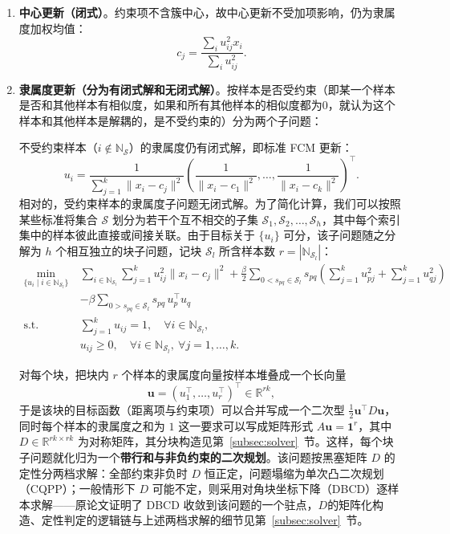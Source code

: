 \documentclass[11pt,a4paper]{ctexart}
\begin{document}
	\begin{enumerate}[label=(\arabic*)]
		\item \textbf{中心更新（闭式）}。约束项不含簇中心，故中心更新不受加项影响，仍为隶属度加权均值：
		\begin{equation}\label{eq:c-update}
			c_j = \frac{\sum_i u_{ij}^{2} x_i}{\sum_i u_{ij}^{2}}.
		\end{equation}
		
		\item \textbf{隶属度更新（分为有闭式解和无闭式解）}。按样本是否受约束（即某一个样本是否和其他样本有相似度，如果和所有其他样本的相似度都为0，就认为这个样本和其他样本是解耦的，是不受约束的）分为两个子问题：
		
		不受约束样本（$i \notin \mathbb{N}_{\mathcal{S}}$）的隶属度仍有闭式解，即标准 FCM 更新：
		\begin{equation}\label{eq:u-closed}
			u_i = \frac{1}{\sum_{j=1}^{k} \|x_i - c_j\|^{2}}
			\left( \frac{1}{\|x_i - c_1\|^{2}}, \ldots, \frac{1}{\|x_i - c_k\|^{2}} \right)^{\!\top}.
		\end{equation}
		相对的，受约束样本的隶属度子问题无闭式解。为了简化计算，我们可以按照某些标准将集合 $\mathcal{S}$ 划分为若干个互不相交的子集 $\mathcal{S}_1, \mathcal{S}_2, \ldots, \mathcal{S}_h$，其中每个索引集中的样本彼此直接或间接关联。由于目标关于 $\{u_i\}$ 可分，该子问题随之分解为 $h$ 个相互独立的块子问题，记块 $\mathcal{S}_l$ 所含样本数 $r = |\mathbb{N}_{\mathcal{S}_l}|$：
		\begin{equation}\label{eq:block-qp}
			\begin{aligned}
				\min_{\{u_i \mid i \in \mathbb{N}_{\mathcal{S}_l}\}}\ &
				\sum_{i \in \mathbb{N}_{\mathcal{S}_l}} \sum_{j=1}^{k} u_{ij}^{2} \|x_i - c_j\|^{2}
				+ \frac{\beta}{2} \sum_{0 < s_{pq} \in \mathcal{S}_l} s_{pq} \left( \sum_{j=1}^{k} u_{pj}^{2} + \sum_{j=1}^{k} u_{qj}^{2} \right) \\
				& - \beta \sum_{0 > s_{pq} \in \mathcal{S}_l} s_{pq}\, u_p^{\top} u_q \\
				\text{s.t.}\ & \sum_{j=1}^{k} u_{ij} = 1,\quad \forall i \in \mathbb{N}_{\mathcal{S}_l}, \\
				& u_{ij} \ge 0,\quad \forall i \in \mathbb{N}_{\mathcal{S}_l},\ \forall j = 1, \ldots, k.
			\end{aligned}
		\end{equation}
		
	对每个块，把块内 \(r\) 个样本的隶属度向量按样本堆叠成一个长向量
	\[
	\mathbf{u}=(u_1^{\top},\ldots,u_r^{\top})^{\top}\in\mathbb{R}^{rk},
	\]
	于是该块的目标函数（距离项与约束项）可以合并写成一个二次型 $\frac{1}{2}\mathbf{u}^{\top}D\mathbf{u}$，同时每个样本的隶属度之和为 $1$ 这一要求可以写成矩阵形式 $A\mathbf{u}=\mathbf{1}^r$，其中 $D\in\mathbb{R}^{rk\times rk}$ 为对称矩阵，其分块构造见第~\ref{subsec:solver}~节。这样，每个块子问题就化归为一个\textbf{带行和与非负约束的二次规划}。该问题按黑塞矩阵 $D$ 的定性分两档求解：全部约束非负时 $D$ 恒正定，问题塌缩为单次凸二次规划（CQPP）；一般情形下 $D$ 可能不定，则采用对角块坐标下降（DBCD）逐样本求解——原论文证明了 DBCD 收敛到该问题的一个驻点，$D$的矩阵化构造、定性判定的逻辑链与上述两档求解的细节见第~\ref{subsec:solver}~节。
	\end{enumerate}
	
\end{document}
